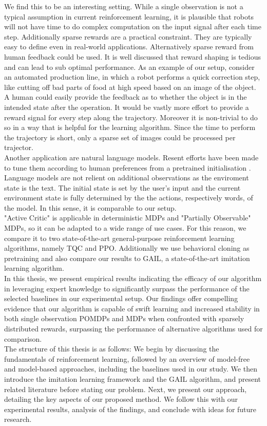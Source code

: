 We find this to be an interesting setting. While a single observation is not a typical assumption in current reinforcement learning, it is plausible that robots 
will not have time to do complex computation on the input signal after each time step. Additionally sparse rewards are a practical constraint. 
They are typically easy to define even in real-world applications. Alternatively sparse reward from human feedback could be used. It is well 
discussed that reward shaping is tedious and can lead to sub optimal performance. As an example of our setup, consider an automated production line, in which a robot performs a quick 
correction step, like cutting off bad parts of food at high speed based on an image of the object. A human could easily provide the feedback as to whether 
the object is in the intended state after the operation. It would be vastly more effort to provide a reward signal for every step along the trajectory. Moreover it is 
non-trivial to do so in a way that is helpful for the learning algorithm. Since the time to perform the trajectory is short, only a sparse set of images could be processed per trajector.\\
Another application are natural language models. Resent efforts have been made to tune 
them according to human preferences from a pretrained initialisation \cite{cite:ChatGPT}. Language models are not relient on additional observations as the enviroment state is the 
text. The initial state is set by the user's input and the current environment state is fully determined by the the actions, respectively words, of the model. 
In this sense, it is comparable to our setup.\\


"Active Critic" is applicable in deterministic MDPs and "Partially Observable" MDPs, 
so it can be adapted to a wide range of use cases. 
For this reason, we compare it to two state-of-the-art general-purpose reinforcement learning algorithms, namely TQC and PPO. Additionally we use behavioral cloning as pretraining  
and also compare our results to GAIL, a state-of-the-art imitation learning algorithm.\\
In this thesis, we present empirical results indicating the efficacy of our algorithm in leveraging expert knowledge to significantly surpass the performance of the selected baselines in our 
experimental setup. Our findings offer compelling evidence that our algorithm is capable of swift learning and increased stability in both single observation POMDPs and MDPs when confronted with 
sparsely distributed rewards, surpassing the performance of alternative algorithms used for comparison.\\

The structure of this thesis is as follows: We begin by discussing the fundamentals of reinforcement learning, followed by an overview of model-free and model-based approaches, 
including the baselines used in our study. We then introduce the imitation learning framework and the GAIL algorithm, and present related literature before stating our problem. 
Next, we present our approach, detailing the key aspects of our proposed method. We follow this with our experimental results, analysis of the findings, and conclude with ideas for future research.